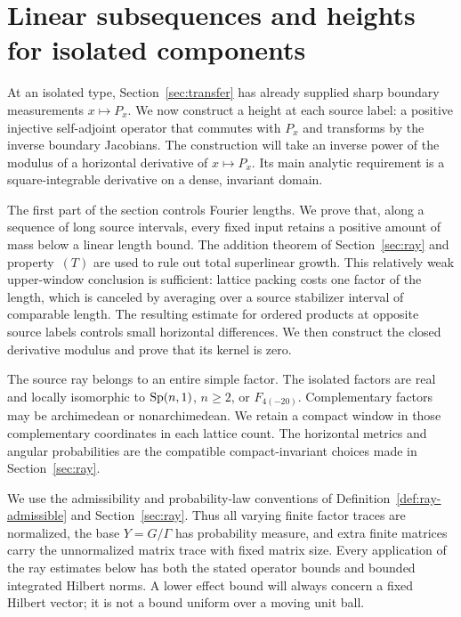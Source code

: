 \section{Linear subsequences and heights for isolated components}\label{sec:scale}

At an isolated type, Section~\ref{sec:transfer} has already supplied
sharp boundary measurements $x\mapsto P_x$. We now construct a height
at each source label: a positive injective self-adjoint operator that
commutes with $P_x$ and transforms by the inverse boundary Jacobians.
The construction will take an inverse power of the modulus of a
horizontal derivative of $x\mapsto P_x$. Its main analytic requirement
is a square-integrable derivative on a dense, invariant domain.

The first part of the section controls Fourier lengths. We prove that,
along a sequence of long source intervals, every fixed input retains a
positive amount of mass below a linear length bound. The addition theorem
of Section~\ref{sec:ray} and property~$(T)$ are used to rule out total
superlinear growth. This relatively weak upper-window conclusion is
sufficient: lattice packing costs one factor of the length, which is
canceled by averaging over a source stabilizer interval of comparable
length. The resulting estimate for ordered products at opposite source
labels controls small horizontal differences. We then construct the
closed derivative modulus and prove that its kernel is zero.

The source ray belongs to an entire simple factor. The isolated factors
are real and locally isomorphic to $\operatorname{Sp}(n,1)$, $n\ge2$, or
$F_{4(-20)}$. Complementary factors may be archimedean or nonarchimedean.
We retain a compact window in those complementary coordinates in each
lattice count. The horizontal metrics and angular probabilities are the
compatible compact-invariant choices made in Section~\ref{sec:ray}.

We use the admissibility and probability-law conventions of
Definition~\ref{def:ray-admissible} and Section~\ref{sec:ray}.  Thus all
varying finite factor traces are normalized, the base $Y=G/\Gamma$ has
probability measure, and extra finite matrices carry the unnormalized
matrix trace with fixed matrix size.  Every application of the ray
estimates below has both the stated operator bounds and bounded
integrated Hilbert norms.  A lower effect bound will always concern a
fixed Hilbert vector; it is not a bound uniform over a moving unit
ball.

